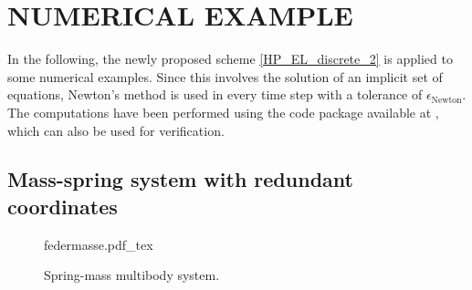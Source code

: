 \documentclass{multibody2023_full_paper}
\begin{document}
\section{NUMERICAL EXAMPLE}\label{sec_examples}
In the following, the newly proposed scheme \eqref{HP_EL_discrete_2} is applied to some numerical examples. Since this involves the solution of an implicit set of equations, Newton's method is used in every time step with a tolerance of $\epsilon_\mathrm{Newton}$. The computations have been performed using the code package available at \cite{kinon_metis_2023}, which can also be used for verification.

\subsection{Mass-spring system with redundant coordinates}

\begin{figure}[b!]
    \centering
    \def\svgwidth{0.6\textwidth}
    {federmasse.pdf_tex}
    \caption{Spring-mass multibody system.}
    \label{fig:federmasse}

\end{figure}
\end{document}
